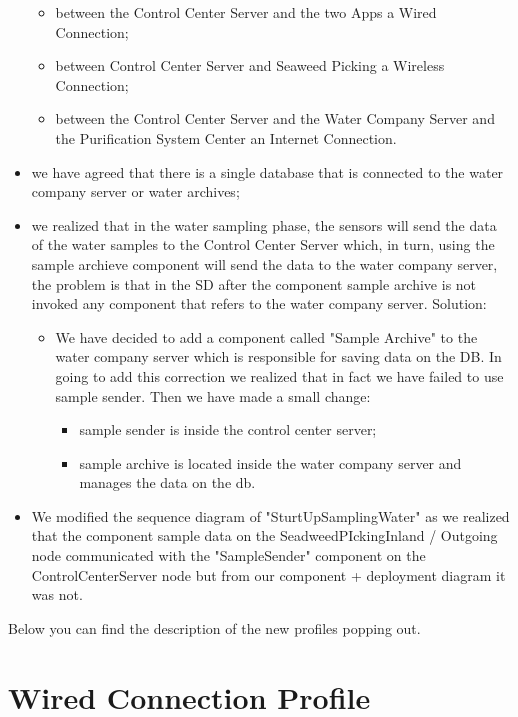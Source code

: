 \begin{itemize}
	\begin{itemize}
		\item between the Control Center Server and the two Apps a 				Wired Connection;
		\item between Control Center Server and Seaweed Picking a 				Wireless Connection;
		\item between the Control Center Server and the Water Company 			Server and the Purification System Center an Internet 					Connection.
	\end{itemize}

	\item we have agreed that there is a single database that is 			connected to the water company server or water archives;
	\item we realized that in the water sampling phase, the sensors 		will send the data of the water samples to the Control Center 			Server which, in turn, using the sample archieve component will 		send the data to the water company server, the problem is that in 		the SD 	after the component sample archive is not invoked any 			component that refers to the water company server. Solution:
	\begin{itemize}
	\item We have decided to add a component called "Sample Archive" 		to the water company server which is responsible for saving data 		on the DB. In going to add this correction we realized 	that in			fact we have failed to use sample sender. Then we have made a 			small change: 
	\begin{itemize}
		\item sample sender is inside 	the control center server;
		\item sample archive is located inside the water company 				server and	manages the data on the db.
		\end{itemize}
	\end{itemize}	
	\item We modified the sequence diagram of "SturtUpSamplingWater" 		as 	we realized that the component sample data on the 					SeadweedPIckingInland / Outgoing node communicated with the 			"SampleSender" component on the ControlCenterServer node but from 		our component + deployment diagram it was not.
\end{itemize}

Below you can find the description of the new profiles popping out.

\section{Wired Connection Profile}

